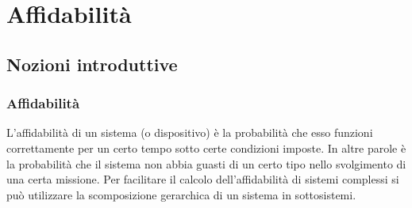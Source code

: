 \documentclass[a4paper]{article}
\begin{document}

\section{Affidabilità}
\subsection{Nozioni introduttive}
\subsubsection*{Affidabilità}
L'affidabilità di un sistema (o dispositivo) è la probabilità che esso funzioni correttamente per un certo tempo sotto certe
condizioni imposte. In altre parole è la probabilità che il sistema non abbia guasti di un certo tipo nello svolgimento di una
certa missione. Per facilitare il calcolo dell'affidabilità di sistemi complessi si può utilizzare la scomposizione gerarchica
di un sistema in sottosistemi.
\end{document}
